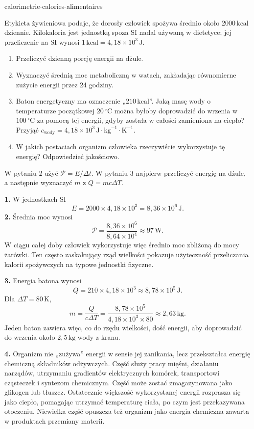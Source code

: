 \begin{exo}{calorimetrie-calories-alimentaires}

Etykieta żywieniowa podaje, że dorosły człowiek spożywa średnio około $2000\,\text{kcal}$ dziennie. Kilokaloria jest jednostką spoza SI nadal używaną w dietetyce; jej przeliczenie na SI wynosi $1\,\text{kcal}=4{,}18\times10^3\,\text{J}$.

\begin{enumerate}
  \item Przeliczyć dzienną porcję energii na dżule.
  \item Wyznaczyć średnią moc metaboliczną w watach, zakładając równomierne zużycie energii przez 24 godziny.
  \item Baton energetyczny ma oznaczenie „$210\,\text{kcal}$”. Jaką masę wody o temperaturze początkowej $20\,^\circ\text{C}$ można byłoby doprowadzić do wrzenia w $100\,^\circ\text{C}$ za pomocą tej energii, gdyby została w całości zamieniona na ciepło? Przyjąć $c_{\text{wody}}=4{,}18\times10^3\,\text{J}\!\cdot\!\text{kg}^{-1}\!\cdot\!\text{K}^{-1}$.
  \item W jakich postaciach organizm człowieka rzeczywiście wykorzystuje tę energię? Odpowiedzieć jakościowo.
\end{enumerate}

\begin{indication}
W pytaniu 2 użyć $\mathcal P=E/\Delta t$. W pytaniu 3 najpierw przeliczyć energię na dżule, a następnie wyznaczyć $m$ z $Q=mc\Delta T$.
\end{indication}

\begin{solution}
\textbf{1.} W jednostkach SI
\[
E=2000\times4{,}18\times10^3=8{,}36\times10^6\,\text{J}.
\]
\textbf{2.} Średnia moc wynosi
\[
\mathcal P=\frac{8{,}36\times10^6}{8{,}64\times10^4}\approx97\,\text{W}.
\]
W ciągu całej doby człowiek wykorzystuje więc średnio moc zbliżoną do mocy żarówki. Ten często zaskakujący rząd wielkości pokazuje użyteczność przeliczania kalorii spożywczych na typowe jednostki fizyczne.

\textbf{3.} Energia batona wynosi
\[
Q=210\times4{,}18\times10^3\approx8{,}78\times10^5\,\text{J}.
\]
Dla $\Delta T=80\,\text{K}$,
\[
m=\frac{Q}{c\Delta T}
=\frac{8{,}78\times10^5}{4{,}18\times10^3\times80}
\approx2{,}63\,\text{kg}.
\]
Jeden baton zawiera więc, co do rzędu wielkości, dość energii, aby doprowadzić do wrzenia około $2{,}5\,\text{kg}$ wody z kranu.

\textbf{4.} Organizm nie „zużywa” energii w sensie jej zanikania, lecz przekształca energię chemiczną składników odżywczych. Część służy pracy mięśni, działaniu narządów, utrzymaniu gradientów elektrycznych komórek, transportowi cząsteczek i syntezom chemicznym. Część może zostać zmagazynowana jako glikogen lub tłuszcz. Ostatecznie większość wykorzystanej energii rozprasza się jako ciepło, pomagając utrzymać temperaturę ciała, po czym jest przekazywana otoczeniu. Niewielka część opuszcza też organizm jako energia chemiczna zawarta w produktach przemiany materii.
\end{solution}
\end{exo}
